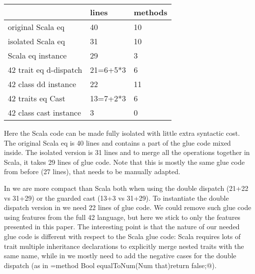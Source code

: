 \noindent
\begin{minipage}{0.46\textwidth}
\begin{tabular}{l |l |l}
&                              lines  &   methods\\
\hline
original Scala eq           &    40   &   10\\
isolated Scala eq           &   31    &   10\\
Scala eq instance           &    29   &    3\\
42 trait eq d-dispatch      &   21=6+5*3   &    6\\
42 class dd instance        &    22   &   11\\
42 traits eq Cast            &   13=7+2*3   &    6\\
42 class cast instance      &     3   &    0\\
\end{tabular}
\end{minipage}
\begin{minipage}{0.54\textwidth}
Here the Scala code can be made fully isolated with little
extra syntactic cost. The original Scala eq is 40 lines and
contains a part of the glue code mixed inside.
The isolated version is 31 lines and to merge all the operations together in Scala, it
takes 29 lines of glue code. Note that this
is mostly the same glue code from before (27 lines), that
needs to be manually adapted.
\end{minipage}

In \name we are
more compact than Scala both when using the double dispatch (21+22 vs 31+29)
or the guarded cast (13+3 vs 31+29).
To instantiate the double dispatch 
version in \name we need 22 lines of glue code.
We could remove such glue code using 
features from the full 42 language, but here we stick to only the features presented in this paper.
The interesting point is that the nature of our needed glue code 
is different with respect to the Scala glue code:
Scala requires lots of trait multiple inheritance declarations to explicitly merge
nested traits with the same name, while in \name we mostly need 
to add the negative cases for the double dispatch (as in
\Q@Sum={method Bool equalToNum(Num that){return false;}}@).



